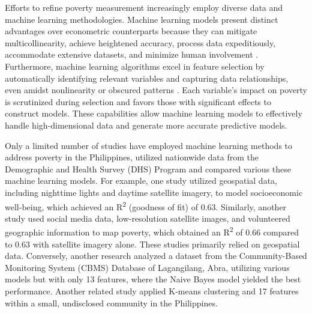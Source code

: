 \documentclass[a4paper,fleqn]{cas-sc}
\begin{document}
Efforts to refine poverty measurement increasingly employ diverse data and machine learning methodologies. Machine learning models present distinct advantages over econometric counterparts because they can mitigate multicollinearity, achieve heightened accuracy, process data expeditiously, accommodate extensive datasets, and minimize human involvement \citep{shobana2021forecasting}. Furthermore, machine learning algorithms excel in feature selection by automatically identifying relevant variables and capturing data relationships, even amidst nonlinearity or obscured patterns \citep{li2017feature}. Each variable’s impact on poverty is scrutinized during selection and favors those with significant effects to construct models. These capabilities allow machine learning models to effectively handle high-dimensional data and generate more accurate predictive models.

Only a limited number of studies have employed machine learning methods to address poverty in the Philippines, utilized nationwide data from the Demographic and Health Survey (DHS) Program and compared various these machine learning models. For example, one study \citep{tingzon2019mapping} utilized geospatial data, including nighttime lights and daytime satellite imagery, to model socioeconomic well-being, which achieved an R\textsuperscript{2} (goodness of fit) of 0.63. Similarly, another study \citep{ledesma2020interpretable} used social media data, low-resolution satellite images, and volunteered geographic information to map poverty, which obtained an R\textsuperscript{2} of 0.66 compared to 0.63 with satellite imagery alone. These studies primarily relied on geospatial data. Conversely, another research \citep{talingdan2019performance} analyzed a dataset from the Community-Based Monitoring System (CBMS) Database of Lagangilang, Abra, utilizing various models but with only 13 features, where the Naive Bayes model yielded the best performance. Another related study \citep{repollo2021applying} applied K-means clustering and 17 features within a small, undisclosed community in the Philippines.
\end{document}
